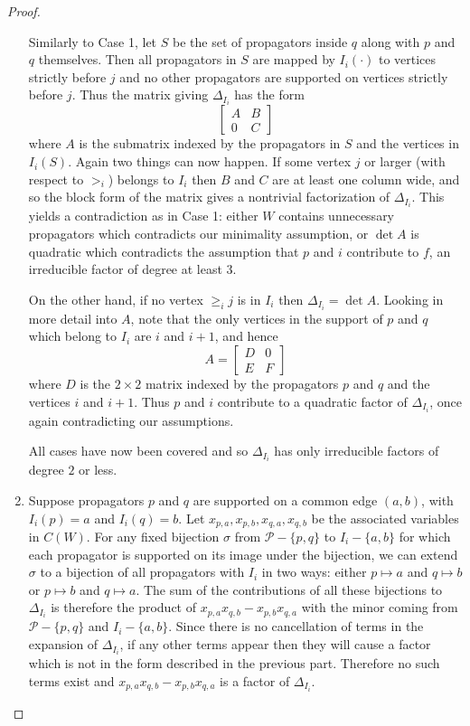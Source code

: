 \documentclass[11pt]{article}
\newcommand{\cP}{\mathcal{P}}
\theoremstyle{remark}
\theoremstyle{definition}
\begin{document}
\begin{proof}
\begin{enumerate}
Similarly to Case 1, let $S$ be the set of propagators inside $q$ along with $p$ and $q$ themselves. Then all propagators in $S$ are mapped by $I_i(\cdot)$ to vertices strictly before $j$ and no other propagators are supported on vertices strictly before $j$.  Thus the matrix giving $\Delta_{I_i}$ has the form
\[
\begin{bmatrix} A & B \\ 0 & C\end{bmatrix}
\]
where $A$ is the submatrix indexed by the propagators in $S$ and the vertices in $I_i(S)$. Again two things can now happen.  If some vertex $j$ or larger (with respect to $>_i$) belongs to $I_i$ then $B$ and $C$ are at least one column wide, and so the block form of the matrix gives a nontrivial factorization of $\Delta_{I_i}$.  This yields a contradiction as in Case 1: either $W$ contains unnecessary propagators which contradicts our minimality assumption, or $\det A$ is quadratic which contradicts the assumption that $p$ and $i$ contribute to $f$, an irreducible factor of degree at least 3.  

On the other hand, if no vertex $\geq_i j$ is in $I_i$ then $\Delta_{I_i} = \det A$.  Looking in more detail into $A$, note that the only vertices in the support of $p$ and $q$ which belong to $I_i$ are $i$ and $i+1$, and hence
\[
A = \begin{bmatrix} D & 0 \\ E & F\end{bmatrix}
\]
where $D$ is the $2\times 2$ matrix indexed by the propagators $p$ and $q$ and the vertices $i$ and $i+1$.  Thus $p$ and $i$ contribute to a quadratic factor of $\Delta_{I_i}$, once again contradicting our assumptions.

All cases have now been covered and so $\Delta_{I_i}$ has only irreducible factors of degree $2$ or less.

\item Suppose propagators $p$ and $q$ are supported on a common edge $(a,b)$, with $I_i(p)=a$ and $I_i(q)=b$.  Let $x_{p,a},x_{p,b},x_{q,a},x_{q,b}$ be the associated variables in $C(W)$. For any fixed bijection $\sigma$ from $\cP-\{p,q\}$ to $I_i -\{a,b\}$ for which each propagator is supported on its image under the bijection, we can extend $\sigma$ to a bijection of all propagators with $I_i$ in two ways: either $p\mapsto a$ and $q\mapsto b$ or $p\mapsto b$ and $q\mapsto a$.  The sum of the contributions of all these bijections to $\Delta_{I_i}$ is therefore the product of $x_{p,a}x_{q,b}-x_{p,b}x_{q,a}$ with the minor coming from $\cP-\{p, q\}$ and $I_i - \{a,b\}$.  Since there is no cancellation of terms in the expansion of $\Delta_{I_i}$, if any other terms appear then they will cause a factor which is not in the form described in the previous part.  Therefore no such terms exist and $x_{p,a}x_{q,b}-x_{p,b}x_{q,a}$ is a factor of $\Delta_{I_i}$.


\end{enumerate}
\end{proof}
\end{document}
